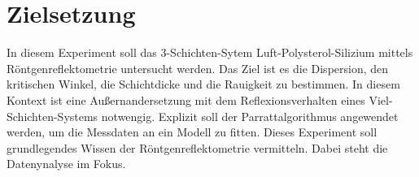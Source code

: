 \chapter{Zielsetzung}
\label{cha:zielsetzung}

In diesem Experiment soll das 3-Schichten-Sytem Luft-Polysterol-Silizium mittels Röntgenreflektometrie untersucht werden. Das Ziel ist es die Dispersion, den kritischen Winkel, 
die Schichtdicke und die Rauigkeit zu bestimmen. In diesem Kontext ist eine Außernandersetzung mit dem Reflexionsverhalten eines Viel-Schichten-Systems notwengig. Explizit soll der Parrattalgorithmus 
angewendet werden, um die Messdaten an ein Modell zu fitten. Dieses Experiment soll grundlegendes Wissen der Röntgenreflektometrie vermitteln. Dabei steht die Datenynalyse im Fokus.